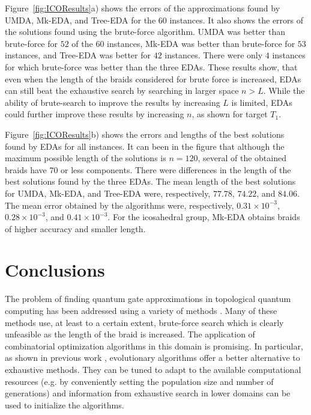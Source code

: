 Figure~\ref{fig:ICOResults}a) shows the errors of the approximations found by UMDA, Mk-EDA, and Tree-EDA for the $60$ instances. It also shows the errors of the solutions found using the brute-force algorithm. UMDA was better than brute-force for $52$ of the $60$ instances, Mk-EDA was better than brute-force for $53$ instances, and Tree-EDA was better for $42$ instances. There were only $4$ instances for which brute-force was better than the three EDAs. These results show, that even when the length of the braids considered for brute force is increased, EDAs can still beat the exhaustive search by searching in larger space $n > L$. While the ability of brute-search to improve the results by increasing $L$ is limited, EDAs could further improve these results by increasing $n$, as shown for target $T_1$. 

Figure~\ref{fig:ICOResults}b) shows the errors and lengths of the best solutions found by EDAs for all instances. It can been in the figure that although the maximum possible length of the solutions is $n=120$, several of the obtained braids have $70$ or less components. There were differences in the length of the best solutions found by the three EDAs. The mean length of the best solutions for UMDA, Mk-EDA, and Tree-EDA were, respectively,  $77.78$,  $74.22$, and  $84.06$. The mean error obtained by the algorithms were, respectively, $0.31 \times 10^{-3}$,   $0.28 \times 10^{-3}$, and $0.41 \times 10^{-3}$. For the icosahedral group, Mk-EDA obtains braids of higher accuracy and smaller length.  

    

\section{Conclusions}  \label{sec:CONCLU}
  
  The problem of finding quantum gate approximations in topological quantum computing has been addressed using a variety of methods \cite{Bonesteel_et_al:2005,Burrello_et_al:2010,Burrello_et_al:2011,Dawson_et_al:2005,Kitaev:2003,Mosseri:2008,Trung_et_al:2012}. Many of these methods use, at least to a certain extent, brute-force search which is clearly unfeasible as the length of the braid is increased. The application of combinatorial optimization algorithms in this domain is promising. In particular, as shown in previous work \cite{Mcdonald_and_Katzgraber:2013,Santana_et_al::2014a}, evolutionary algorithms offer a better alternative to exhaustive methods. They can be tuned to adapt to the available computational resources (e.g. by conveniently setting the population size and number of generations) and information from exhaustive search in lower domains can be used to initialize the algorithms.



